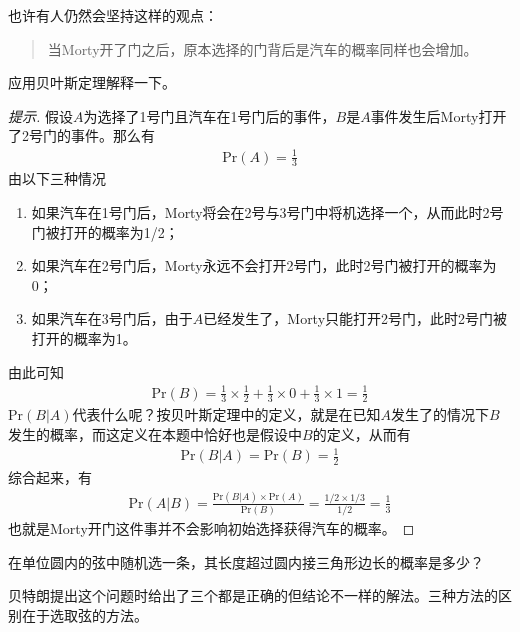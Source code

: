 \begin{example}
  也许有人仍然会坚持这样的观点：
  \begin{quotation}
    当Morty开了门之后，原本选择的门背后是汽车的概率同样也会增加。
  \end{quotation}
  应用贝叶斯定理解释一下。
\end{example}
\begin{proof}[提示]
  假设$A$为选择了1号门且汽车在1号门后的事件，$B$是$A$事件发生后Morty打开了2号门的事件。那么有
  \begin{align*}
    \mathrm{Pr}(A)=\frac13
  \end{align*}
  由以下三种情况
  \begin{enumerate}
  \item 如果汽车在1号门后，Morty将会在2号与3号门中将机选择一个，从而此时2号门被打开的概率为1/2；
  \item 如果汽车在2号门后，Morty永远不会打开2号门，此时2号门被打开的概率为0；
  \item 如果汽车在3号门后，由于$A$已经发生了，Morty只能打开2号门，此时2号门被打开的概率为1。
  \end{enumerate}

  由此可知
  \begin{align*}
    \mathrm{Pr}(B)=\frac13\times\frac12 + \frac13\times0 + \frac13\times 1=\frac12
  \end{align*}
  $\mathrm{Pr}(B|A)$代表什么呢？按贝叶斯定理中的定义，就是在已知$A$发生了的情况下$B$发生的概率，而这定义在本题中恰好也是假设中$B$的定义，从而有
  \begin{align*}
    \mathrm{Pr}(B|A) = \mathrm{Pr}(B)=\frac12
  \end{align*}
  综合起来，有
  \begin{align*}
    \mathrm{Pr}(A|B)=\frac{\mathrm{Pr}(B|A)\times \mathrm{Pr}(A)}{\mathrm{Pr}(B)}
    =\frac{1/2\times 1/3}{1/2}=\frac13
  \end{align*}
  也就是Morty开门这件事并不会影响初始选择获得汽车的概率。
\end{proof}

\begin{example}
  在单位圆内的弦中随机选一条，其长度超过圆内接三角形边长的概率是多少？
\end{example}
贝特朗提出这个问题时给出了三个都是正确的但结论不一样的解法。三种方法的区别在于选取弦的方法。

